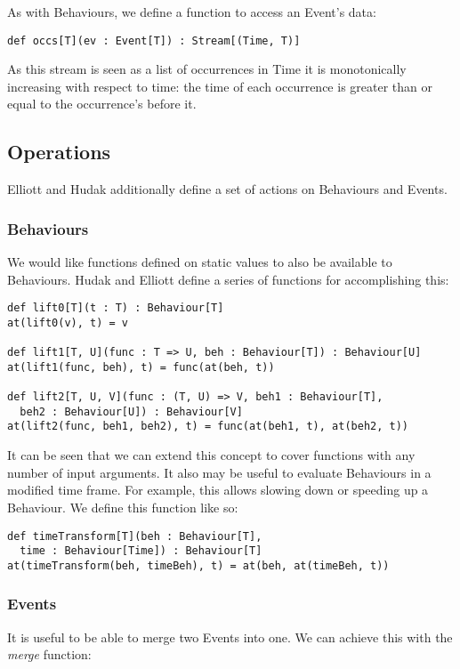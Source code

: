         As with Behaviours, we define a function to access an Event's data:
        
\begin{verbatim}
def occs[T](ev : Event[T]) : Stream[(Time, T)]
\end{verbatim}

        As this stream is seen as a list of occurrences in Time it is monotonically
        increasing with respect to time: the time of each occurrence is greater than
        or equal to the occurrence's before it.
       
    \subsection{Operations}
      Elliott and Hudak additionally define a set of actions on Behaviours and Events.
      
      \subsubsection{Behaviours}
        We would like functions defined on static values to also be available to Behaviours. Hudak
        and Elliott define a series of functions for accomplishing this:
        
\begin{verbatim}
def lift0[T](t : T) : Behaviour[T]
at(lift0(v), t) = v  
  
def lift1[T, U](func : T => U, beh : Behaviour[T]) : Behaviour[U]
at(lift1(func, beh), t) = func(at(beh, t))

def lift2[T, U, V](func : (T, U) => V, beh1 : Behaviour[T], 
  beh2 : Behaviour[U]) : Behaviour[V]
at(lift2(func, beh1, beh2), t) = func(at(beh1, t), at(beh2, t))
\end{verbatim}

      It can be seen that we can extend this concept to cover functions with any number of input arguments.
      It also may be useful to evaluate Behaviours in a modified time frame. For example, this allows
      slowing down or speeding up a Behaviour. We define this function like so:

\begin{verbatim}
def timeTransform[T](beh : Behaviour[T], 
  time : Behaviour[Time]) : Behaviour[T]
at(timeTransform(beh, timeBeh), t) = at(beh, at(timeBeh, t))
\end{verbatim}
        
      \subsubsection{Events}
        It is useful to be able to merge two Events into one. We can achieve this with the \emph{merge} function:

